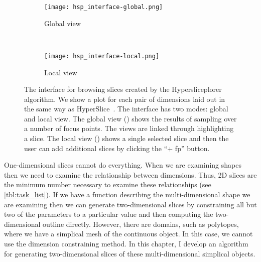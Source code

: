 
\begin{figure}
  \centering
  \begin{subfigure}[b]{0.45\linewidth}
    \texttt{[image: hsp\_interface-global.png]}
    \caption{Global view}
    \label{fig:interface:global} 
  \end{subfigure} 
  ~
  \begin{subfigure}[b]{0.45\linewidth}
    \texttt{[image: hsp\_interface-local.png]}
    \caption{Local view}
    \label{fig:interface:local} 
  \end{subfigure}
  \caption{%
    The interface for browsing slices created by the Hypersliceplorer algorithm.
    We show a plot for each pair of dimensions laid out in the same way as
    HyperSlice~\cite{Wijk:1993}.
    The interface has two modes: global and local view.
    The global view () 
    shows the results of sampling over a number of focus points. The views
    are linked through highlighting a slice. The local view 
    () shows a single selected slice and then
    the user can add additional slices by clicking the ``+ fp'' button.
  }
  \label{fig:interface}
\end{figure}

One-dimensional slices cannot do everything. When we are examining shapes then
we need to examine the relationship between dimensions. Thus, 2D slices are the
minimum number necessary to examine these relationships (see
\autoref{tbl:task_list}).  If we have a function describing the
multi-dimensional shape we are examining then we can generate two-dimensional
slices by constraining all but two of the parameters to a particular value and
then computing the two-dimensional outline directly. However, there are
domains, such as polytopes, where we have a simplical mesh of the continuous
object. In this case, we cannot use the dimension constraining method. In this
chapter, I develop an algorithm for generating two-dimensional slices of these
multi-dimensional simplical objects. 










